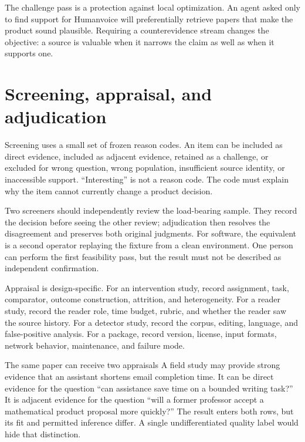 The challenge pass is a protection against local optimization. An agent asked
only to find support for Humanvoice will preferentially retrieve papers that
make the product sound plausible. Requiring a counterevidence stream changes
the objective: a source is valuable when it narrows the claim as well as when
it supports one.

\section{Screening, appraisal, and adjudication}
\label{sec:method-screening}

Screening uses a small set of frozen reason codes. An item can be included as
direct evidence, included as adjacent evidence, retained as a challenge, or
excluded for wrong question, wrong population, insufficient source identity,
or inaccessible support. ``Interesting'' is not a reason code. The code must
explain why the item cannot currently change a product decision.

Two screeners should independently review the load-bearing sample. They record
the decision before seeing the other review; adjudication then resolves the
disagreement and preserves both original judgments. For software, the
equivalent is a second operator replaying the fixture from a clean environment.
One person can perform the first feasibility pass, but the result must not be
described as independent confirmation.

Appraisal is design-specific. For an intervention study, record assignment,
task, comparator, outcome construction, attrition, and heterogeneity. For a
reader study, record the reader role, time budget, rubric, and whether the
reader saw the source history. For a detector study, record the corpus,
editing, language, and false-positive analysis. For a package, record version,
license, input formats, network behavior, maintenance, and failure mode.

\begin{cardexample}{The same paper can receive two appraisals}
A field study may provide strong evidence that an assistant shortens email
completion time. It can be direct evidence for the question ``can assistance
save time on a bounded writing task?'' It is adjacent evidence for the question
``will a former professor accept a mathematical product proposal more quickly?''
The result enters both rows, but its fit and permitted inference differ. A
single undifferentiated quality label would hide that distinction.
\end{cardexample}

